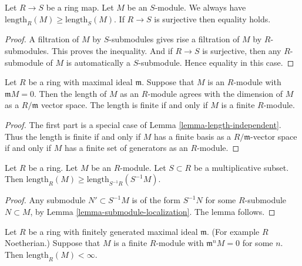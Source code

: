\begin{lemma}
\label{lemma-length-independent}
Let $R \to S$ be a ring map. Let $M$ be an $S$-module.
We always have $\text{length}_R(M) \geq \text{length}_S(M)$.
If $R \to S$ is surjective then equality holds.
\end{lemma}

\begin{proof}
A filtration of $M$ by $S$-submodules gives rise a filtration
of $M$ by $R$-submodules. This proves the inequality.
And if $R \to S$ is surjective, then any $R$-submodule
of $M$ is automatically a $S$-submodule. Hence equality
in this case.
\end{proof}

\begin{lemma}
\label{lemma-dimension-is-length}
Let $R$ be a ring with maximal ideal $\mathfrak m$.
Suppose that $M$ is an $R$-module with
$\mathfrak m M  =  0$. Then the length of $M$ as
an $R$-module agrees with the dimension of $M$ as
a $R/\mathfrak m$ vector space.
The length is finite if and only if $M$ is a finite $R$-module.
\end{lemma}

\begin{proof}
The first part is a special case of Lemma \ref{lemma-length-independent}.
Thus the length is finite if and only if $M$ has a finite basis
as a $R/\mathfrak m$-vector space if and only if $M$ has a finite
set of generators as an $R$-module.
\end{proof}

\begin{lemma}
\label{lemma-length-localize}
Let $R$ be a ring. Let $M$ be an $R$-module. Let $S \subset R$ be
a multiplicative subset. Then
$\text{length}_R(M) \geq \text{length}_{S^{-1}R}(S^{-1}M)$.
\end{lemma}

\begin{proof}
Any submodule $N' \subset S^{-1}M$ is of the form
$S^{-1}N$ for some $R$-submodule $N \subset M$, by Lemma
\ref{lemma-submodule-localization}. The lemma follows.
\end{proof}

\begin{lemma}
\label{lemma-length-finite}
Let $R$ be a ring with finitely generated
maximal ideal $\mathfrak m$. (For example $R$ Noetherian.)
Suppose that $M$ is a finite $R$-module with
$\mathfrak m^n M  =  0$ for some $n$.
Then $\text{length}_R(M) < \infty$.
\end{lemma}

